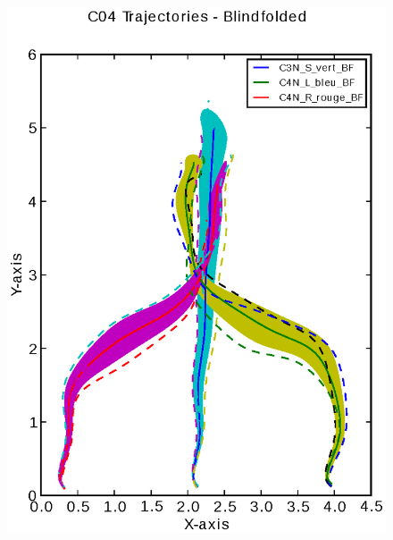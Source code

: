 \documentclass[a4page,landscape,twocolumn,10pt]{article}
\begin{document}
\begin{figure}[!htbp]
  \includegraphics[width=0.4\linewidth]{C04_trajectory_BF.eps}
\end{figure}

\newpage
\end{document}
